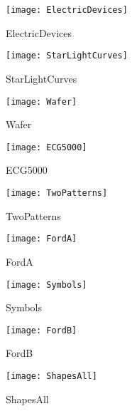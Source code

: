 \documentclass[../../thesis.tex]{subfiles}
\begin{document}
\begin{figure}[h]
    \centering
    \begin{minipage}[b]{0.32\textwidth}
        \centering
        \texttt{[image: ElectricDevices]}
        \caption*{ElectricDevices}
    \end{minipage}
    \hfill
    \begin{minipage}[b]{0.32\textwidth}
        \centering
        \texttt{[image: StarLightCurves]}
        \caption*{StarLightCurves}
    \end{minipage}
    \hfill
    \begin{minipage}[b]{0.32\textwidth}
        \centering
        \texttt{[image: Wafer]}
        \caption*{Wafer}
    \end{minipage}
    
    \vspace{0.4cm}
    
    \begin{minipage}[b]{0.32\textwidth}
        \centering
        \texttt{[image: ECG5000]}
        \caption*{ECG5000}
    \end{minipage}
    \hfill
    \begin{minipage}[b]{0.32\textwidth}
        \centering
        \texttt{[image: TwoPatterns]}
        \caption*{TwoPatterns}
    \end{minipage}
    \hfill
    \begin{minipage}[b]{0.32\textwidth}
        \centering
        \texttt{[image: FordA]}
        \caption*{FordA}
    \end{minipage}
    
    \vspace{0.4cm}
    
    \begin{minipage}[b]{0.32\textwidth}
        \centering
        \texttt{[image: Symbols]}
        \caption*{Symbols}
    \end{minipage}
    \hfill
    \begin{minipage}[b]{0.32\textwidth}
        \centering
        \texttt{[image: FordB]}
        \caption*{FordB}
    \end{minipage}
    \hfill
    \begin{minipage}[b]{0.32\textwidth}
        \centering
        \texttt{[image: ShapesAll]}
        \caption*{ShapesAll}
    \end{minipage}
    

\end{figure}
\end{document}

